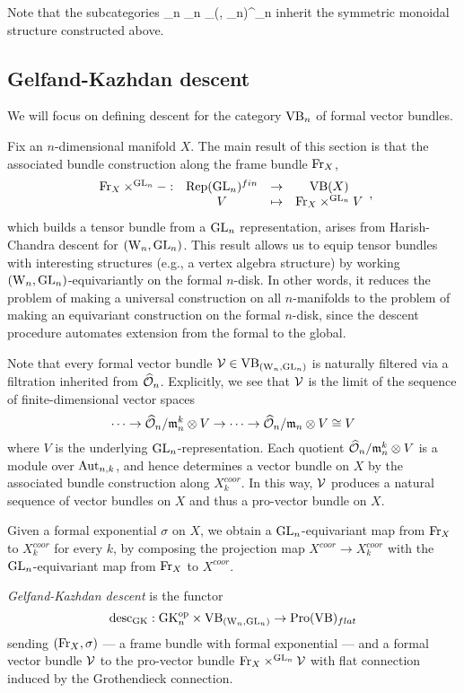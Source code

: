 Note that the subcategories 
\ben
\Tens_n \hookrightarrow \VB_n
\hookrightarrow \Mod_{(\Vect, \GL_n)}^{\cO_n}
\een
inherit the symmetric monoidal structure constructed above. 

\subsection{Gelfand-Kazhdan descent}

We will focus on defining descent for the category ${\rm VB}_n$ of formal vector
bundles. 

Fix an $n$-dimensional manifold $X$.
The main result of this section is that the associated bundle construction along the frame bundle ${\rm Fr}_X$,
\[
\begin{array}{cccc}
{\rm Fr}_X \times^{{\rm GL}_n} - :&  {\rm Rep}({\rm GL}_n)^{fin} & \to &{\rm VB}(X)\\
& V & \mapsto & {\rm Fr}_X \times^{{\rm GL}_n} V
\end{array},
\]
which builds a tensor bundle from a ${\rm GL}_n$ representation, arises from Harish-Chandra descent for $({{\rm W}_n},{\rm GL}_n)$. 
This result allows us to equip tensor bundles with interesting structures (e.g., a vertex algebra structure) by working $({{\rm W}_n},{\rm GL}_n)$-equivariantly on the formal $n$-disk.
In other words, it reduces the problem of making a universal
construction on all $n$-manifolds to the problem of making an
equivariant construction on the formal $n$-disk,
since the descent procedure automates extension from the formal to the global.

Note that every formal vector bundle $\mathcal{V} \in {\rm VB}_{({{\rm W}_n}, {\rm GL}_n)}$ is naturally filtered via a filtration inherited from $\widehat{\mathcal O}_n$. 
Explicitly, we see that $\mathcal{V}$ is the limit of the sequence of finite-dimensional vector spaces
\[
\cdots \to \widehat{\mathcal O}_n/{\mathfrak m}_n^k \otimes V \to \cdots \to \widehat{\mathcal O}_n/{\mathfrak m}_n \otimes V \cong V
\]
where $V$ is the underlying ${\rm GL}_n$-representation.
Each quotient $\widehat{\mathcal O}_n/{\mathfrak m}_n^k \otimes V$ is a module over ${\rm Aut}_{n,k}$, and 
hence determines a vector bundle on $X$ by the associated bundle construction along $X^{coor}_k$.
In this way, $\mathcal{V}$ produces a natural sequence of vector bundles on $X$ and thus a pro-vector bundle on $X$.

Given a formal exponential $\sigma$ on $X$, we obtain a ${\rm GL}_n$-equivariant map from ${\rm Fr}_X$ to $X^{coor}_k$ for every $k$,
by composing the projection map $X^{coor} \to X_k^{coor}$ with the ${\rm GL}_n$-equivariant map from ${\rm Fr}_X$ to $X^{coor}$.

\begin{dfn}
{\em Gelfand-Kazhdan descent} is the functor
\[
{\rm desc}_{\rm GK}: {\rm GK}_n^{{\rm op}} \times {\rm VB}_{({{\rm W}_n}, {\rm GL}_n)} \to {\rm Pro}({\rm VB})_{flat}
\]
sending $({\rm Fr}_X,\sigma)$ --- a frame bundle with formal exponential
--- and a formal vector bundle $\mathcal{V}$ 
to the pro-vector bundle ${\rm Fr}_X \times^{{\rm GL}_n} \mathcal{V}$ with flat connection induced by the Grothendieck connection.
\end{dfn}

